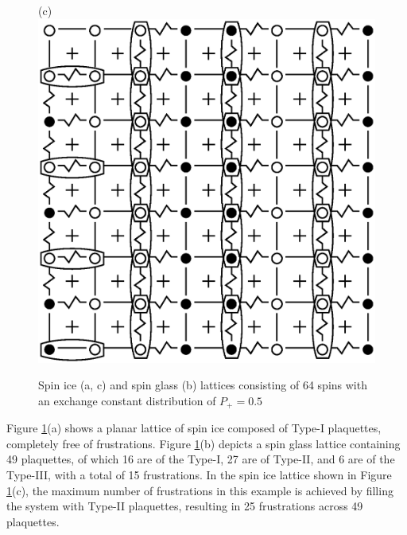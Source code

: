 \documentclass[preprint,12pt]{elsarticle}
\begin{document}
\begin{figure}[H]
\begin{minipage}[h]{0.3\linewidth}
	\end{minipage}
	\hfill
	\begin{minipage}[h]{0.3\linewidth}
		\centering(c)
		\includegraphics[width=1\linewidth]{pictures/SI_64_J0}
	\end{minipage}
	\hfill
	\caption{Spin ice (a, c) and spin glass (b) lattices consisting of 64 spins with an exchange constant distribution of $P_+ = 0.5$}
	\label{fig:cell_SI_SG_64}

\end{figure}


Figure \ref{fig:cell_SI_SG_64}(a) shows a planar lattice of spin ice composed of Type-I plaquettes, completely free of frustrations.
Figure \ref{fig:cell_SI_SG_64}(b) depicts a spin glass lattice containing 49 plaquettes, of which 16 are of the Type-I, 27 are of Type-II, and 6 are of the Type-III, with a total of 15 frustrations.
In the spin ice lattice shown in Figure \ref{fig:cell_SI_SG_64}(c), the maximum number of frustrations in this example is achieved by filling the system with Type-II plaquettes, resulting in 25 frustrations across 49 plaquettes.
\end{document}
